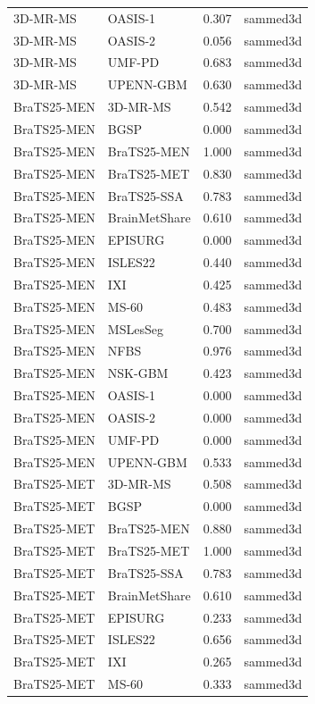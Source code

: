 \begin{tabular}{llrl}
3D-MR-MS & OASIS-1 & 0.307 & sammed3d \\
3D-MR-MS & OASIS-2 & 0.056 & sammed3d \\
3D-MR-MS & UMF-PD & 0.683 & sammed3d \\
3D-MR-MS & UPENN-GBM & 0.630 & sammed3d \\
BraTS25-MEN & 3D-MR-MS & 0.542 & sammed3d \\
BraTS25-MEN & BGSP & 0.000 & sammed3d \\
BraTS25-MEN & BraTS25-MEN & 1.000 & sammed3d \\
BraTS25-MEN & BraTS25-MET & 0.830 & sammed3d \\
BraTS25-MEN & BraTS25-SSA & 0.783 & sammed3d \\
BraTS25-MEN & BrainMetShare & 0.610 & sammed3d \\
BraTS25-MEN & EPISURG & 0.000 & sammed3d \\
BraTS25-MEN & ISLES22 & 0.440 & sammed3d \\
BraTS25-MEN & IXI & 0.425 & sammed3d \\
BraTS25-MEN & MS-60 & 0.483 & sammed3d \\
BraTS25-MEN & MSLesSeg & 0.700 & sammed3d \\
BraTS25-MEN & NFBS & 0.976 & sammed3d \\
BraTS25-MEN & NSK-GBM & 0.423 & sammed3d \\
BraTS25-MEN & OASIS-1 & 0.000 & sammed3d \\
BraTS25-MEN & OASIS-2 & 0.000 & sammed3d \\
BraTS25-MEN & UMF-PD & 0.000 & sammed3d \\
BraTS25-MEN & UPENN-GBM & 0.533 & sammed3d \\
BraTS25-MET & 3D-MR-MS & 0.508 & sammed3d \\
BraTS25-MET & BGSP & 0.000 & sammed3d \\
BraTS25-MET & BraTS25-MEN & 0.880 & sammed3d \\
BraTS25-MET & BraTS25-MET & 1.000 & sammed3d \\
BraTS25-MET & BraTS25-SSA & 0.783 & sammed3d \\
BraTS25-MET & BrainMetShare & 0.610 & sammed3d \\
BraTS25-MET & EPISURG & 0.233 & sammed3d \\
BraTS25-MET & ISLES22 & 0.656 & sammed3d \\
BraTS25-MET & IXI & 0.265 & sammed3d \\
BraTS25-MET & MS-60 & 0.333 & sammed3d \\

\end{tabular}

